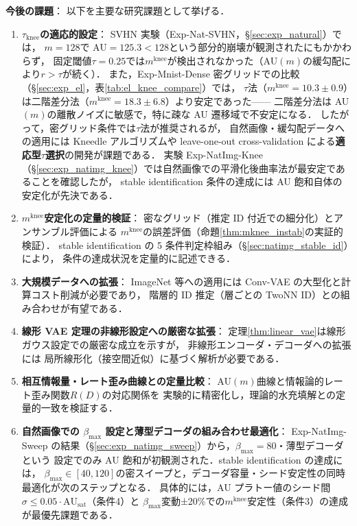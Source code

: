 \documentclass[11pt,a4paper]{jsarticle}
\newcommand{\AUsat}{\mathrm{AU}_{\mathrm{sat}}}
\newcommand{\mknee}{m^{\mathrm{knee}}}
\begin{document}
\textbf{今後の課題}：
以下を主要な研究課題として挙げる．

\begin{enumerate}
  \item \textbf{$\tau_{\mathrm{knee}}$の適応的設定}：
        SVHN 実験（Exp-Nat-SVHN，§\ref{sec:exp_natural}）では，
        $m = 128$で AU$= 125.3 < 128$という部分的崩壊が観測されたにもかかわらず，
        固定閾値$\tau = 0.25$では$\mknee$が検出されなかった（AU$(m)$の緩勾配により$r > \tau$が続く）．
        また，Exp-Mnist-Dense 密グリッドでの比較（§\ref{sec:exp_el}，表\ref{tab:el_knee_compare}）では，
        $\tau$法（$\mknee=10.3\pm0.9$）は二階差分法（$\mknee=18.3\pm6.8$）より安定であった——
        二階差分法は AU$(m)$の離散ノイズに敏感で，特に疎な AU 遷移域で不安定になる．
        したがって，密グリッド条件では$\tau$法が推奨されるが，
        自然画像・緩勾配データへの適用には Kneedle アルゴリズムや
        leave-one-out cross-validation による\textbf{適応型$\tau$選択}の開発が課題である．
        実験 Exp-NatImg-Knee（§\ref{sec:exp_natimg_knee}）では自然画像での平滑化後曲率法が最安定であることを確認したが，
        stable identification 条件の達成には AU 飽和自体の安定化が先決である．
  \item \textbf{$\mknee$安定化の定量的検証}：
        密なグリッド（推定 ID 付近での細分化）とアンサンブル評価による
        $\mknee$の誤差評価（命題\ref{thm:mknee_instab}の実証的検証）．
        stable identification の 5 条件判定枠組み（§\ref{sec:natimg_stable_id}）により，
        条件の達成状況を定量的に記述できる．
  \item \textbf{大規模データへの拡張}：
        ImageNet 等への適用には Conv-VAE の大型化と計算コスト削減が必要であり，
        階層的 ID 推定（層ごとの TwoNN ID）との組み合わせが有望である．
  \item \textbf{線形 VAE 定理の非線形設定への厳密な拡張}：
        定理\ref{thm:linear_vae}は線形ガウス設定での厳密な成立を示すが，
        非線形エンコーダ・デコーダへの拡張には
        局所線形化（接空間近似）に基づく解析が必要である．
  \item \textbf{相互情報量・レート歪み曲線との定量比較}：
        AU$(m)$曲線と情報論的レート歪み関数$R(D)$の対応関係を
        実験的に精密化し，理論的水充填解との定量的一致を検証する．
  \item \textbf{自然画像での $\beta_{\max}$ 設定と薄型デコーダの組み合わせ最適化}：
        Exp-NatImg-Sweep の結果（§\ref{sec:exp_natimg_sweep}）から，$\beta_{\max}=80$・薄型デコーダという
        設定でのみ AU 飽和が初観測された．stable identification の達成には，
        $\beta_{\max} \in [40,120]$の密スイープと，デコーダ容量・シード安定性の同時最適化が次のステップとなる．
        具体的には，AU プラトー値のシード間$\sigma \leq 0.05 \cdot \AUsat$（条件4）と
        $\beta_{\max}$変動±20\%での$\mknee$安定性（条件3）の達成が最優先課題である．
\end{enumerate}
\end{document}
